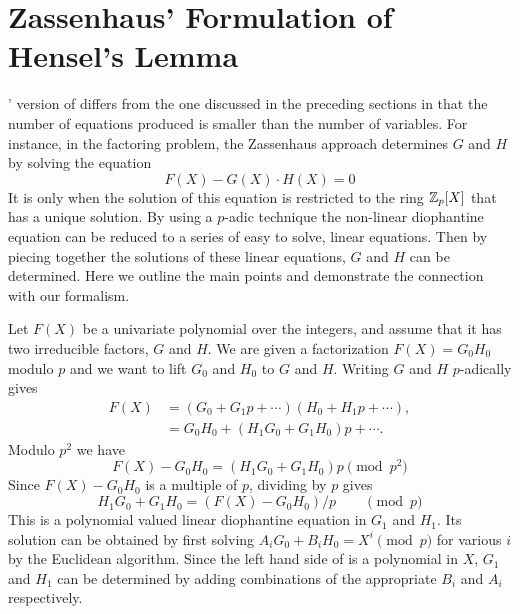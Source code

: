 \section{Zassenhaus' Formulation of Hensel's Lemma}
\label{Zassenhaus:Formulation:Sec}

{\Zassenhaus}' version of  differs from the one
discussed in the preceding sections in that the number of equations
produced is smaller than the number of variables.  For instance, in
the factoring problem, the Zassenhaus approach determines $G$ and $H$
by solving the equation
\begin{equation}
 \label{Zassen:Factor:Eq}
F(X) - G(X) \cdot H(X) = 0
\end{equation}
It is only when the solution of this equation is restricted to the ring
$\mathbb{Z}_{p}[X]$ that  has a unique solution.  By using
a $p$-adic technique the non-linear diophantine equation
 can be reduced to a series of easy to solve,
linear equations.  Then by piecing together the solutions of these linear
equations, $G$ and $H$ can be determined.  Here we outline the main 
points and demonstrate the connection with our formalism.

Let $F(X)$ be a univariate polynomial over the integers, and assume
that it has two irreducible factors, $G$ and $H$.  We are given a
factorization $F(X) = G_0 H_0$ modulo $p$ and we want to lift $G_0$
and $H_0$ to $G$ and $H$.  Writing $G$ and $H$ $p$-adically gives
\[
\begin{aligned}
  F(X) &= (G_0 + G_1 p + \cdots) (H_0 + H_1 p + \cdots), \\
   &= G_0 H_0 + (H_1 G_0 + G_1 H_0) p + \cdots.
\end{aligned}
\]
Modulo $p^2$ we have
\[
F(X) - G_0 H_0 = (H_1 G_0 + G_1 H_0) p \pmod{p^2}
\]
Since $F(X) - G_0 H_0$ is a multiple of $p$, dividing by $p$ gives 
\begin{equation}
H_1 G_0 + G_1 H_0 = \left( F(X) - G_0 H_0 \right) / p \qquad\pmod{p}
\label{Linear:Dio:Eq}
\end{equation}
This is a polynomial valued linear diophantine equation in $G_1$ and $H_1$.  Its solution can be obtained by 
first solving $A_i G_0 + B_i H_0 = X^i \pmod{p}$ for various $i$ by the 
Euclidean algorithm.  Since the left hand side of  
is a polynomial in $X$, $G_1$ and $H_1$ can be determined by adding 
combinations of the appropriate $B_i$ and $A_i$ respectively.

